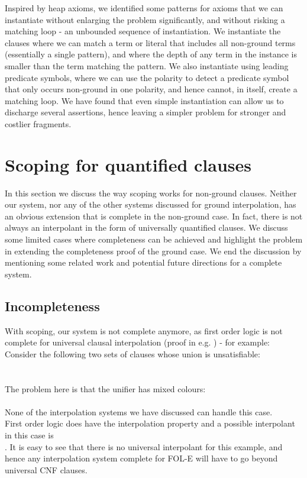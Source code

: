 Inspired by heap axioms, we identified some patterns for axioms that we can instantiate without enlarging the problem significantly, and without risking a matching loop - an unbounded sequence of instantiation. We instantiate the clauses where we can match a term or literal that includes all non-ground terms (essentially a single pattern), and where the depth of any term in the instance is smaller than the term matching the pattern. 
We also instantiate using leading predicate symbols, where we can use the polarity to detect a predicate symbol that only occurs non-ground in one polarity, and hence cannot, in itself, create a matching loop. We have found that even simple instantiation can allow us to discharge several assertions, hence leaving a simpler problem for stronger and costlier fragments.

\section{Scoping for quantified clauses}\label{section:fole:scoping}
In this section we discuss the way scoping works for non-ground clauses.
Neither our system, nor any of the other systems discussed for ground interpolation, has an obvious extension that is complete in the non-ground case. In fact, there is not always an interpolant in the form of universally quantified clauses. 
We discuss some limited cases where completeness can be achieved and highlight the problem in extending the completeness proof of the ground case.
We end the discussion by mentioning some related work and potential future directions for a complete system.

\subsection{Incompleteness}
With scoping, our system is not complete anymore, as first order logic is not complete for universal clausal interpolation (proof in e.g. \cite{KovacsVoronkov09}) - for example:\\
Consider the following two sets of clauses whose union is unsatisfiable:\\
\\
\\
The problem here is that the unifier has mixed colours:\\
\\
None of the interpolation systems we have discussed can handle this case.\\
First order logic does have the interpolation property and a possible interpolant in this case is\\ . It is easy to see that there is no universal interpolant for this example, and hence any interpolation system complete for FOL-E will have to go beyond universal CNF clauses.

